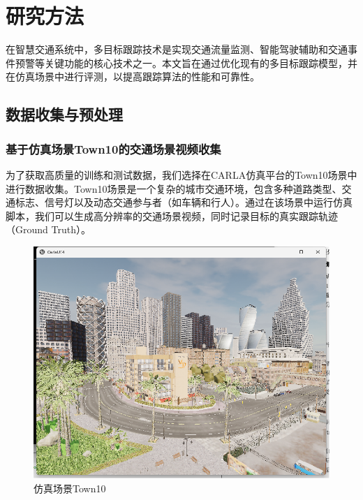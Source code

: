 \chapter{研究方法}

在智慧交通系统中，多目标跟踪技术是实现交通流量监测、智能驾驶辅助和交通事件预警等关键功能的核心技术之一。本文旨在通过优化现有的多目标跟踪模型，并在仿真场景中进行评测，以提高跟踪算法的性能和可靠性。

\section{数据收集与预处理}



\subsection{基于仿真场景Town10的交通场景视频收集}

为了获取高质量的训练和测试数据，我们选择在CARLA仿真平台的Town10场景中进行数据收集。Town10场景是一个复杂的城市交通环境，包含多种道路类型、交通标志、信号灯以及动态交通参与者（如车辆和行人）\cite{leal2016learning}。通过在该场景中运行仿真脚本，我们可以生成高分辨率的交通场景视频，同时记录目标的真实跟踪轨迹（Ground Truth）。




\begin{figure}[htbp] %
	\centering
	\includegraphics[width=1\textwidth]{p5} %
	\caption{仿真场景Town10} %
	\label{fig:p5} %
\end{figure}





